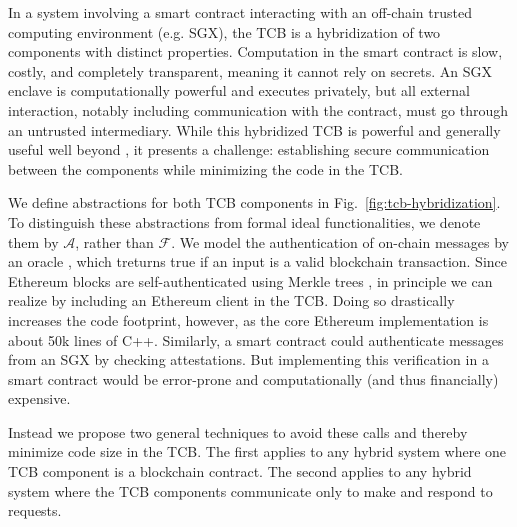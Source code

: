 In a system involving a smart contract interacting with an off-chain trusted computing environment (e.g. SGX),
the TCB is a hybridization of two components with distinct properties.
Computation in the smart contract is slow, costly, and completely transparent, meaning it cannot rely on secrets.
An SGX enclave is computationally powerful and executes privately, but all external interaction, notably including communication with the contract, must go through an untrusted intermediary. While this hybridized TCB is powerful and generally useful well beyond \tc, it presents a challenge: establishing secure communication between the components while minimizing the code in the TCB.


We define abstractions for both TCB components in Fig.~\ref{fig:tcb-hybridization}. To distinguish these abstractions from formal ideal functionalities, we denote them by $\mathcal{A}$, rather than $\mathcal{F}$.
We model the authentication of on-chain messages by an oracle \oauth, which treturns true if an input is a valid blockchain transaction.
Since Ethereum blocks are self-authenticated using Merkle trees \cite{whitepaper,yellowpaper},
in principle we can realize \oauth by including an Ethereum client in the TCB.
Doing so drastically increases the code footprint, however, as the core Ethereum implementation is about 50k lines of C++.
Similarly, a smart contract could authenticate messages from an SGX by checking attestations.
But implementing this verification in a smart contract would be error-prone and computationally (and thus financially) expensive.

Instead we propose two general techniques to avoid these calls and thereby minimize code size in the TCB.
The first applies to any hybrid system where one TCB component is a blockchain contract.
The second applies to any hybrid system where the TCB components communicate only to make and respond to requests.

